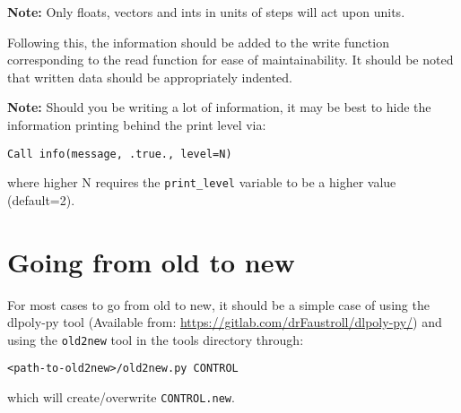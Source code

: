 \textbf{Note:} Only floats, vectors and ints in units of steps will act upon units.

Following this, the information should be added to the write function corresponding to the read function for ease of maintainability. It should be noted that written data should be appropriately indented.

\textbf{Note:} Should you be writing a lot of information, it may be best to hide the information printing behind the print level via:
\begin{verbatim}
Call info(message, .true., level=N)
\end{verbatim}
where higher N requires the \verb#print_level# variable to be a higher value (default=2).

\section{Going from old to new}
For most cases to go from old to new, it should be a simple case of using the dlpoly-py tool (Available from: \url{https://gitlab.com/drFaustroll/dlpoly-py/}) and using the \verb#old2new# tool in the tools directory through:
\begin{verbatim}
<path-to-old2new>/old2new.py CONTROL
\end{verbatim}
which will create/overwrite \verb#CONTROL.new#.


